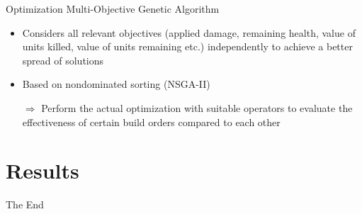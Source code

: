 \documentclass{beamer}
\begin{document}
\begin{frame}{Optimization}
\alert{Multi-Objective Genetic Algorithm} 
\begin{itemize}
\item Considers all relevant objectives (applied damage, remaining health, value of units killed, value of units remaining etc.) independently to achieve a better spread of solutions
\item Based on \alert{nondominated sorting} (NSGA-II)
\item[$\Rightarrow$] Perform the actual optimization with suitable operators to \alert{evaluate the effectiveness of certain build orders} compared to each other
\end{itemize}
\end{frame}

\section{Results}








%
%
%


\begin{frame}
\Huge{\centerline{The End}}
\end{frame}

\end{document}
